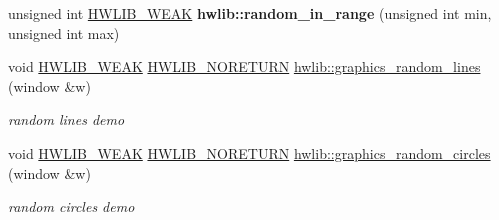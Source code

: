 \begin{DoxyCompactItemize}
\item 
unsigned int \hyperlink{hwlib-defines_8hpp_a04be4340016df60d6636c1d1c6d94fc9}{H\+W\+L\+I\+B\+\_\+\+W\+E\+AK} {\bfseries hwlib\+::random\+\_\+in\+\_\+range} (unsigned int min, unsigned int max)\hypertarget{namespacehwlib_a0b714101e3779c837076fdc3bc6017bf}{}\label{namespacehwlib_a0b714101e3779c837076fdc3bc6017bf}

\item 
void \hyperlink{hwlib-defines_8hpp_a04be4340016df60d6636c1d1c6d94fc9}{H\+W\+L\+I\+B\+\_\+\+W\+E\+AK} \hyperlink{hwlib-defines_8hpp_aef311f1f416fdcbd1fa22376dcc01029}{H\+W\+L\+I\+B\+\_\+\+N\+O\+R\+E\+T\+U\+RN} \hyperlink{namespacehwlib_ae834adde804bdf781c39695800879a1f}{hwlib\+::graphics\+\_\+random\+\_\+lines} (window \&w)
\begin{DoxyCompactList}\small\item\em random lines demo \end{DoxyCompactList}\item 
void \hyperlink{hwlib-defines_8hpp_a04be4340016df60d6636c1d1c6d94fc9}{H\+W\+L\+I\+B\+\_\+\+W\+E\+AK} \hyperlink{hwlib-defines_8hpp_aef311f1f416fdcbd1fa22376dcc01029}{H\+W\+L\+I\+B\+\_\+\+N\+O\+R\+E\+T\+U\+RN} \hyperlink{namespacehwlib_a51b02af57df1cd71b9bea0bf5f9fdc63}{hwlib\+::graphics\+\_\+random\+\_\+circles} (window \&w)
\begin{DoxyCompactList}\small\item\em random circles demo \end{DoxyCompactList}\end{DoxyCompactItemize}
